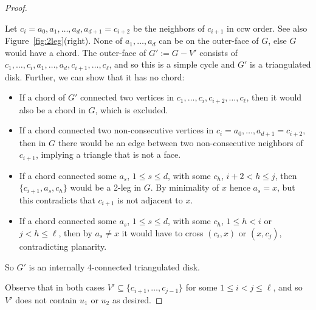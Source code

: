 \documentclass[12pt]{article}
\begin{document}
\begin{proof}
\begin{itemize}
Let $c_i=a_0,a_1,\dots,a_d,a_{d+1}=c_{i+2}$ be the neighbors of
$c_{i+1}$ in ccw order.  
See also Figure~\ref{fig:2leg}(right).
None of $a_1,\dots,a_d$ can be on the outer-face
of $G$, else $G$ would have a chord.  The outer-face of $G':=G-V'$
consists of $c_1,\dots,c_i,a_1,\dots,a_d,c_{i+1},\dots,c_\ell$, and so
this is a simple cycle and $G'$ is a triangulated disk.   Further, we
can show that it has no chord:
\begin{itemize}
\item If a chord of $G'$ connected two vertices in 
$c_1,\dots,c_i,c_{i+2},\dots,c_\ell$,
then it would also be a chord in $G$, which is excluded.
\item If a chord connected two non-consecutive vertices in
$c_i{=}a_0,\dots,a_{d+1}{=}c_{i+2}$, then in $G$ there would be an edge between two
non-consecutive neighbors of $c_{i+1}$, implying a triangle that is not a face.
\item If a chord connected some $a_s$, $1\leq s\leq d$, with some 
$c_h$, $i+2<h\leq j$, then $\{c_{i+1},a_s,c_h\}$ would be a 2-leg in $G$.
By minimality of $x$ hence $a_s=x$, but this contradicts that $c_{i+1}$ is
not adjacent to $x$.
\item If a chord connected some $a_s$, $1\leq s\leq d$, with some 
$c_h$, $1\leq h<i$ or $j<h\leq \ell$, then by $a_s\neq x$ it would have to cross $(c_i,x)$
or $(x,c_j)$, contradicting planarity.
\end{itemize}
So $G'$ is an internally 4-connected triangulated disk.  
\end{itemize}
Observe that in both cases
$V'\subseteq \{c_{i+1},\dots,c_{j-1}\}$
for some $1\leq i< j\leq \ell$, and so $V'$ does not contain $u_1$ or $u_2$
as desired.
\end{proof}
\end{document}
